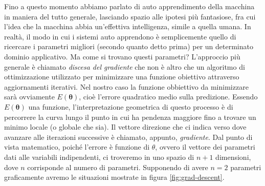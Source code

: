 \documentclass[12pt,a4paper,twoside,openright]{book}
\begin{document}
Fino a questo momento abbiamo parlato di auto apprendimento della macchina in maniera del tutto generale, lasciando spazio alle ipotesi più fantasiose, fra cui l'idea che la macchina abbia un'effettiva intelligenza, simile a quella umana. In realtà, il modo in cui i sistemi auto apprendono è semplicemente quello di ricercare i parametri migliori (secondo quanto detto prima) per un determinato dominio applicativo. Ma come si trovano questi parametri? 
L'approccio più generale è chiamato \emph{discesa del gradiente} che non è altro che un algoritmo di ottimizzazione utilizzato per minimizzare una funzione obiettivo attraverso aggiornamenti iterativi. Nel nostro caso la funzione obbiettivo da minimizzare sarà ovviamente $E(\mathbf{\theta})$, cioè l'errore quadratico medio sulla predizione.
Essendo $E(\mathbf{\theta})$ una funzione, l'interpretazione geometrica di questo processo è di percorrere la curva lungo il punto in cui ha pendenza maggiore fino a trovare un minimo locale (o globale che sia).
Il vettore direzione che ci indica verso dove avanzare alle iterazioni successive è chiamato, appunto, \emph{gradiente}.
Dal punto di vista matematico, poiché l'errore è funzione di $\theta$, ovvero il vettore dei parametri dati alle variabili indipendenti, ci troveremo in uno spazio di $n+1$ dimensioni, dove $n$ corrisponde al numero di parametri. Supponendo di avere $n=2$ parametri graficamente avremo
le situazioni mostrate in figura \ref{fig:grad-descent}.
\end{document}
